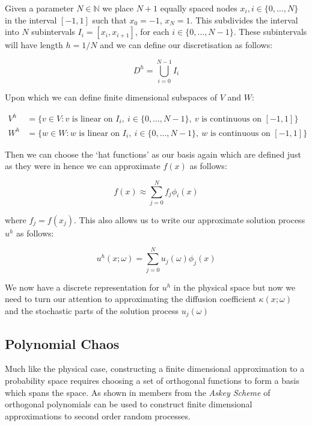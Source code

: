 Given a parameter $N \in \mathbb{N}$ we place $N+1$ equally spaced nodes
$x_i, i \in \{0,\ldots,N\}$ in the interval $[-1,1]$ such that $x_0= -1$,
$x_N = 1$. This subdivides the interval into $N$ subintervals
$I_i = [x_i, x_{i+1}]$, for each $i \in \{0,\ldots,N-1\}$. These subintervals
will have length $h = 1/N$ and we can define our discretisation as follows:

\[
    D^h = \bigcup_{i=0}^{N - 1}I_i
\]

Upon which we can define finite dimensional subspaces of $V$ and $W$:

\begin{align*}
    V^h &= \{v \in V : v \text{ is linear on } I_i,\ i \in \{0,\ldots,N-1\},
                    \  v \text{ is continuous on } [-1,1]\} \\
    W^h &= \{w \in W : w \text{ is linear on } I_i,\ i \in \{0,\ldots,N-1\},
                    \  w \text{ is continuous on } [-1,1]\}
\end{align*}

Then we can choose the `hat functions' as our basis again which are defined
just as they were in  hence we can approximate $f(x)$
as follows:

\begin{equation}\label{eq:oned-stochastic-f-approx}
    f(x) \approx \sum_{j=0}^Nf_j\phi_i(x)
\end{equation}

where $f_j = f(x_j)$. This also allows us to write our approximate solution
process $u^h$ as follows:

\begin{equation}\label{eq:oned-stochastic-uh}
    u^h(x;\omega) = \sum_{j=0}^Nu_j(\omega)\phi_j(x)
\end{equation}

We now have a discrete representation for $u^h$ in the physical space but now
we need to turn our attention to approximating the diffusion coefficient
$\kappa(x;\omega)$ and the stochastic parts of the solution process
$u_j(\omega)$

\subsection{Polynomial Chaos}

Much like the physical case, constructing a finite dimensional approximation to
a probability space requires choosing a set of orthogonal functions to form a
basis which spans the space. As shown in \cite{gpc} members from the
\textit{Askey Scheme} of orthogonal polynomials can be used to construct finite
dimensional approximations to second order random processes.

